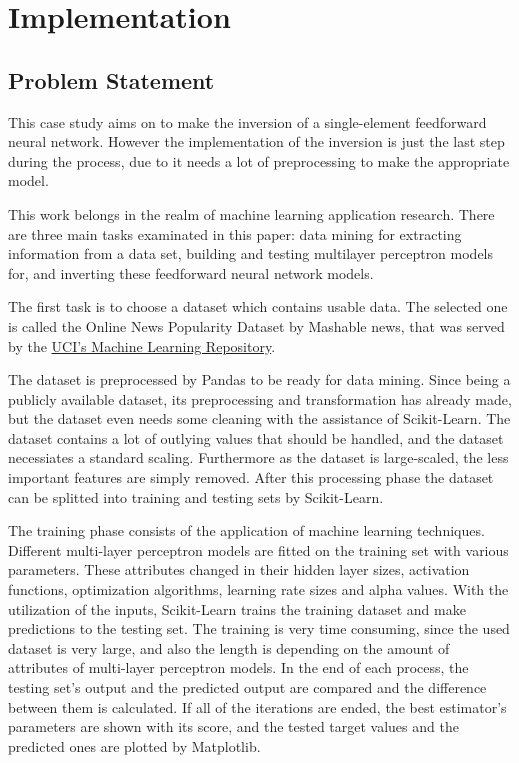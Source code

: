 \chapter{Implementation}

\section{Problem Statement}

This case study aims on to make the inversion of a single-element feedforward neural network. However the implementation of the inversion is just the last step during the process, due to it needs a lot of preprocessing to make the appropriate model.\smallskip

This work belongs in the realm of machine learning application research. There are three main tasks examinated in this paper: data mining for extracting information from a data set, building and testing multilayer perceptron models for, and inverting these feedforward neural network models. \medskip

The first task is to choose a dataset which contains usable data. The selected one is called the Online News Popularity Dataset by Mashable news, that was served by the  \href{http://archive.ics.uci.edu/ml/datasets/Online+News+Popularity}{UCI's Machine Learning Repository}. \smallskip

The dataset is preprocessed by Pandas to be ready for data mining. Since being a publicly available dataset, its preprocessing and transformation has already made, but the dataset even needs some cleaning with the assistance of Scikit-Learn. The dataset contains a lot of outlying values that should be handled, and the dataset necessiates a standard scaling. Furthermore as the dataset is large-scaled, the less important features are simply removed. After this processing phase the dataset can be splitted into training and testing sets by Scikit-Learn. \smallskip

The training phase consists of the application of machine learning techniques. Different multi-layer perceptron models are fitted on the training set with various parameters. These attributes changed in their hidden layer sizes, activation functions, optimization algorithms, learning rate sizes and alpha values. With the utilization of the inputs, Scikit-Learn trains the training dataset and make predictions to the testing set. The training is very time consuming, since the used dataset is very large, and also the length is depending on the amount of attributes of multi-layer perceptron models. In the end of each process, the testing set's output and the predicted output are compared and the difference between them is calculated. If all of the iterations are ended, the best estimator's parameters are shown with its score, and the tested target values and the predicted ones are plotted by Matplotlib.\smallskip

